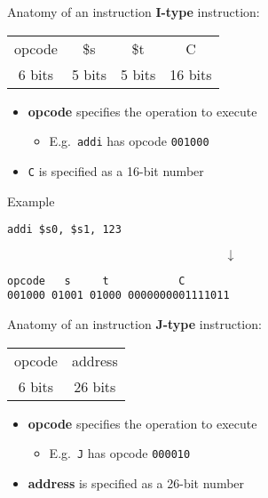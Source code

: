\begin{frame}[fragile]{Anatomy of an instruction}
	\pause \textbf{I-type} instruction:
	\setlength{\tabcolsep}{4.8pt}
	\begin{tabular}{|*{32}{c|}}
		\hline &&&&&&&&&&&&&&&&&&&&&&&&&&&&&&& \\\hline
		\multicolumn{6}{|c|}{opcode} &
		\multicolumn{5}{|c|}{\$s} &
		\multicolumn{5}{|c|}{\$t} &
		\multicolumn{16}{|c|}{C} \\
		\multicolumn{6}{|c|}{6 bits} &
		\multicolumn{5}{|c|}{5 bits} &
		\multicolumn{5}{|c|}{5 bits} &
		\multicolumn{16}{|c|}{16 bits} \\\hline
	\end{tabular}
	\begin{itemize}
		\pause\item \textbf{opcode} specifies the operation to execute
			\begin{itemize}
				\pause\item E.g.\ \lstinline{addi} has opcode \texttt{001000}
			\end{itemize}
		\pause\item \lstinline{C} is specified as a 16-bit number
	\end{itemize}
\end{frame}

\begin{frame}[fragile]{Example}
	\begin{lstlisting}
addi $s0, $s1, 123
	\end{lstlisting}
	$$ \downarrow $$
	\begin{lstlisting}
opcode   s     t           C
001000 01001 01000 0000000001111011
	\end{lstlisting}
\end{frame}

\begin{frame}{Anatomy of an instruction}
	\pause \textbf{J-type} instruction:
	\setlength{\tabcolsep}{4.8pt}
	\begin{tabular}{|*{32}{c|}}
		\hline &&&&&&&&&&&&&&&&&&&&&&&&&&&&&&& \\\hline
		\multicolumn{6}{|c|}{opcode} &
		\multicolumn{26}{|c|}{address} \\
		\multicolumn{6}{|c|}{6 bits} &
		\multicolumn{26}{|c|}{26 bits} \\\hline
	\end{tabular}
	\begin{itemize}
		\pause\item \textbf{opcode} specifies the operation to execute
			\begin{itemize}
				\pause\item E.g.\ \lstinline{J} has opcode \texttt{000010}
			\end{itemize}
		\pause\item \textbf{address} is specified as a 26-bit number
	\end{itemize}
\end{frame}

